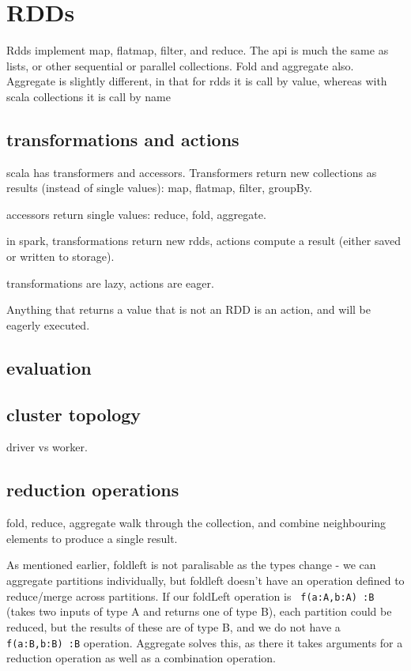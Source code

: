 \section{RDDs}

Rdds implement map, flatmap, filter, and reduce. The api is much the same as lists, or other sequential or parallel collections. Fold and aggregate also. Aggregate is slightly different, in that for rdds it is call by value, whereas with scala collections it is call by name 

\subsection{transformations and actions}

scala has transformers and accessors. Transformers return new collections as results (instead of single values): map, flatmap, filter, groupBy.

accessors return single values: reduce, fold, aggregate.

in spark, transformations return new rdds, actions compute a result (either saved or written to storage).

transformations are lazy, actions are eager.

Anything that returns a value that is not an RDD is an action, and will be eagerly executed.

\subsection{evaluation}

\subsection{cluster topology}

driver vs worker.

\subsection{reduction operations}

fold, reduce, aggregate walk through the collection, and combine neighbouring elements to produce a single result.

As mentioned earlier, foldleft is not paralisable as the types change - we can aggregate partitions individually, but foldleft doesn't have an operation defined to reduce/merge across partitions. If our foldLeft operation is \lstinline| f(a:A,b:A) :B| (takes two inputs of type A and returns one of type B), each partition could be reduced, but the results of these are of type B, and we do not have a \lstinline| f(a:B,b:B) :B| operation. Aggregate solves this, as there it takes arguments for a reduction operation as well as a combination operation.

